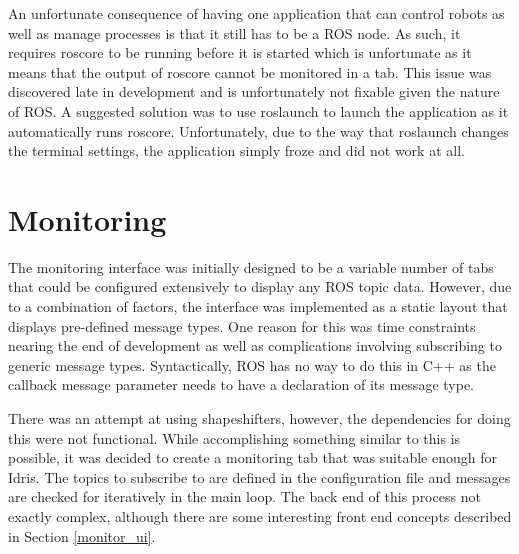 An unfortunate consequence of having one application that can control robots as well as manage processes is that it still has to be a {\selectfont ROS} node. As such, it requires {\selectfont roscore} to be running before it is started which is unfortunate as it means that the output of {\selectfont roscore} cannot be monitored in a tab. This issue was discovered late in development and is unfortunately not fixable given the nature of {\selectfont ROS}. A suggested solution was to use {\selectfont roslaunch} to launch the application as it automatically runs {\selectfont roscore}. Unfortunately, due to the way that {\selectfont roslaunch} changes the terminal settings, the application simply froze and did not work at all.

\section{Monitoring}
\label{monitoring}

The monitoring interface was initially designed to be a variable number of tabs that could be configured extensively to display any {\selectfont ROS} topic data. However, due to a combination of factors, the interface was implemented as a static layout that displays pre-defined message types. One reason for this was time constraints nearing the end of development as well as complications involving subscribing to generic message types. Syntactically, {\selectfont ROS} has no way to do this in {\selectfont C++} as the callback message parameter needs to have a declaration of its message type.

There was an attempt at using shapeshifters\cite{shapeshifter}, however, the dependencies for doing this were not functional. While accomplishing something similar to this is possible, it was decided to create a monitoring tab that was suitable enough for Idris. The topics to subscribe to are defined in the configuration file and messages are checked for iteratively in the main loop. The back end of this process not exactly complex, although there are some interesting front end concepts described in Section \ref{monitor_ui}.
